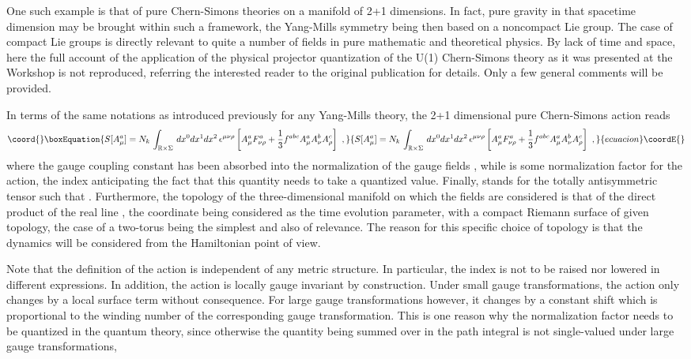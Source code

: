 \documentclass[a4paper,11pt]{article}
\def\R{\mathbb R}
\begin{document}
One such example is that of pure Chern-Simons theories on a manifold of 2+1 
dimensions.\cite{Wit2}
In fact, pure gravity in that spacetime dimension may be brought within
such a framework, the Yang-Mills symmetry being then based on a noncompact
Lie group.\cite{Wit3} The case of compact Lie groups is directly relevant 
to quite a number of fields in pure mathematic and theoretical 
physics.\cite{Wit2,Goldin} By lack
of time and space, here the full account of the application of the physical
projector quantization of the U(1) Chern-Simons theory as it was presented
at the Workshop is not reproduced, referring the interested reader
to the original publication for details.\cite{JG2bis,JG9} Only a few 
general comments will be provided.

In terms of the same notations as introduced previously for any Yang-Mills
theory, the 2+1 dimensional pure Chern-Simons action reads
\begin{equation}\coord{}\boxEquation{
S[A^a_\mu]=N_k\,\int_{\R\times\Sigma}\,dx^0dx^1dx^2\,
\epsilon^{\mu\nu\rho}\left[A^a_\mu F^a_{\nu\rho}+\frac{1}{3}f^{abc}
A^a_\mu A^b_\nu A^c_\rho\right]\ ,
}{
S[A^a_\mu]=N_k\,\int_{\R\times\Sigma}\,dx^0dx^1dx^2\,
\epsilon^{\mu\nu\rho}\left[A^a_\mu F^a_{\nu\rho}+\frac{1}{3}f^{abc}
A^a_\mu A^b_\nu A^c_\rho\right]\ ,
}{ecuacion}\coordE{}\end{equation}
where the gauge coupling constant has been absorbed into the normalization
of the gauge fields \coordHE{}, while \coordHE{} is some normalization factor
for the action, the index \coordHE{} anticipating the fact that this quantity
needs to take a quantized value. Finally, \myHighlight{$\epsilon^{\mu\nu\rho}$}\coordHE{} stands
for the totally antisymmetric tensor such that \coordHE{}.
Furthermore, the topology of the three-dimensional manifold on which the
fields are considered is that of the direct product of the real line \myHighlight{$\R$}\coordHE{},
the coordinate \coordHE{} being considered as the time evolution parameter,
with a compact Riemann surface \myHighlight{$\Sigma$}\coordHE{} of given topology, the case of
a two-torus being the simplest and also of relevance. The reason for this
specific choice of topology is that the dynamics will be considered
from the Hamiltonian point of view. 

Note that the definition of the action is independent of any metric
structure. In particular, the index \coordHE{} is not to be raised nor
lowered in different expressions. In addition, the action is locally gauge
invariant by construction. Under small gauge transformations, the action
only changes by a local surface term without consequence. For large gauge
transformations however, it changes by a constant shift which is
proportional to the winding number of the corresponding gauge transformation.
This is one reason why the normalization factor \coordHE{} needs to be quantized
in the quantum theory, since otherwise the quantity \coordHE{} being
summed over in the path integral is not single-valued under large gauge
transformations,
\end{document}
